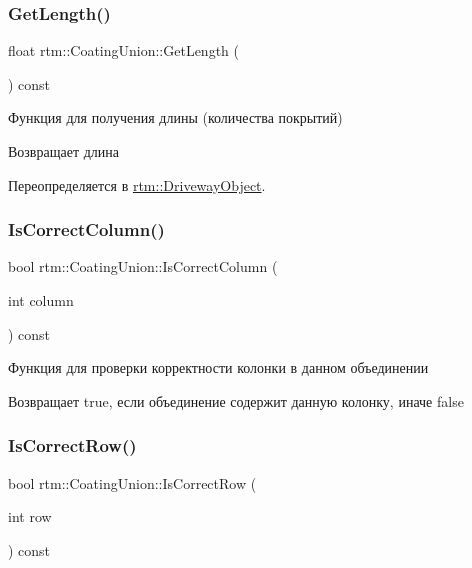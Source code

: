 \subsubsection{\texorpdfstring{Get\+Length()}{GetLength()}}
{\footnotesize\ttfamily float rtm\+::\+Coating\+Union\+::\+Get\+Length (\begin{DoxyParamCaption}{ }\end{DoxyParamCaption}) const\hspace{0.3cm}{\ttfamily [virtual]}}



Функция для получения длины (количества покрытий) 

\begin{DoxyReturn}{Возвращает}
длина 
\end{DoxyReturn}


Переопределяется в \hyperlink{classrtm_1_1_driveway_object_a5de41ef395ad8ccefb435e568f84ed40}{rtm\+::\+Driveway\+Object}.

\mbox{\label{classrtm_1_1_coating_union_a7f77378af1ea7473d10497ad01effcad}} 
\subsubsection{\texorpdfstring{Is\+Correct\+Column()}{IsCorrectColumn()}}
{\footnotesize\ttfamily bool rtm\+::\+Coating\+Union\+::\+Is\+Correct\+Column (\begin{DoxyParamCaption}\item[{int}]{column }\end{DoxyParamCaption}) const}



Функция для проверки корректности колонки в данном объединении 

\begin{DoxyReturn}{Возвращает}
true, если объединение содержит данную колонку, иначе false 
\end{DoxyReturn}
\mbox{\label{classrtm_1_1_coating_union_abbd51ea78ee3d798807827f6ee930540}} 
\subsubsection{\texorpdfstring{Is\+Correct\+Row()}{IsCorrectRow()}}
{\footnotesize\ttfamily bool rtm\+::\+Coating\+Union\+::\+Is\+Correct\+Row (\begin{DoxyParamCaption}\item[{int}]{row }\end{DoxyParamCaption}) const}



